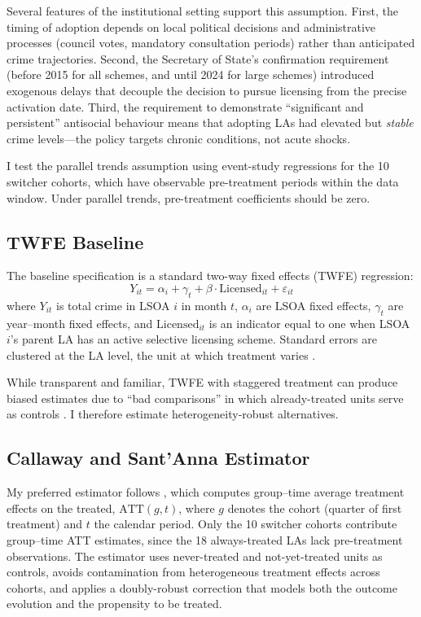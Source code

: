 \documentclass[12pt]{article}
\begin{document}
Several features of the institutional setting support this assumption. First, the timing of adoption depends on local political decisions and administrative processes (council votes, mandatory consultation periods) rather than anticipated crime trajectories. Second, the Secretary of State's confirmation requirement (before 2015 for all schemes, and until 2024 for large schemes) introduced exogenous delays that decouple the decision to pursue licensing from the precise activation date. Third, the requirement to demonstrate ``significant and persistent'' antisocial behaviour means that adopting LAs had elevated but \emph{stable} crime levels---the policy targets chronic conditions, not acute shocks.

I test the parallel trends assumption using event-study regressions for the 10 switcher cohorts, which have observable pre-treatment periods within the data window. Under parallel trends, pre-treatment coefficients should be zero.

\subsection{TWFE Baseline}

The baseline specification is a standard two-way fixed effects (TWFE) regression:
\begin{equation}
Y_{it} = \alpha_i + \gamma_t + \beta \cdot \text{Licensed}_{it} + \varepsilon_{it}
\label{eq:twfe}
\end{equation}
where $Y_{it}$ is total crime in LSOA $i$ in month $t$, $\alpha_i$ are LSOA fixed effects, $\gamma_t$ are year--month fixed effects, and $\text{Licensed}_{it}$ is an indicator equal to one when LSOA $i$'s parent LA has an active selective licensing scheme. Standard errors are clustered at the LA level, the unit at which treatment varies \citep{cameron2015}.

While transparent and familiar, TWFE with staggered treatment can produce biased estimates due to ``bad comparisons'' in which already-treated units serve as controls \citep{goodmanbacon2021, dechaisemartin2020}. I therefore estimate heterogeneity-robust alternatives.

\subsection{Callaway and Sant'Anna Estimator}

My preferred estimator follows \citet{callaway2021}, which computes group--time average treatment effects on the treated, $\text{ATT}(g,t)$, where $g$ denotes the cohort (quarter of first treatment) and $t$ the calendar period. Only the 10 switcher cohorts contribute group--time ATT estimates, since the 18 always-treated LAs lack pre-treatment observations. The estimator uses never-treated and not-yet-treated units as controls, avoids contamination from heterogeneous treatment effects across cohorts, and applies a doubly-robust correction that models both the outcome evolution and the propensity to be treated.
\end{document}

